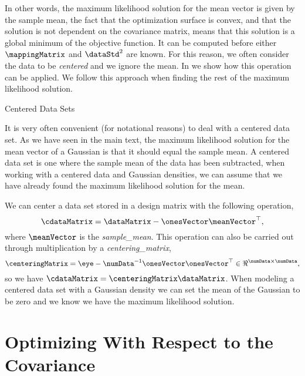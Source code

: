 In other words, the maximum likelihood solution for the mean vector is
given by the sample mean, the fact that the optimization surface is
convex, and that the solution is not dependent on the covariance
matrix, means that this solution is a global minimum of the objective
function. It can be computed before either $\mappingMatrix$ and
$\dataStd^2$ are known. For this reason, we often consider the data to
be \emph{centered} and we ignore the mean. In  we
show how this operation can be applied. We follow this approach when
finding the rest of the maximum likelihood solution.
\begin{tipfloat}
  \caption{Centered Data Sets}\label{tip:centered}

  \boxfontsize It is very often convenient (for notational reasons) to
  deal with a centered data set. As we have seen in the main text, the
  maximum likelihood solution for the mean vector of a Gaussian is
  that it should equal the sample mean. A centered data set is one
  where the sample mean of the data has been subtracted, when working
  with a centered data and Gaussian densities, we can assume that we
  have already found the maximum likelihood solution for the mean. 

  We can center a data set stored in a design matrix with the
  following operation,
  \[
  \cdataMatrix = \dataMatrix - \onesVector \meanVector^\top,
  \]
  where $\meanVector$ is the \emph{\gls{sample_mean}}. This
  operation can also be carried out through multiplication by a
  \emph{\gls{centering_matrix}},
  \[
  \centeringMatrix=\eye-\numData^{-1}\onesVector\onesVector^{\top}\in\Re^{\numData\times\numData},
  \]
  so we have $\cdataMatrix = \centeringMatrix \dataMatrix$. When
  modeling a centered data set with a Gaussian density we can set the
  mean of the Gaussian to be zero and we know we have the maximum
  likelihood solution.
\end{tipfloat}

\section{Optimizing With Respect to the Covariance}

